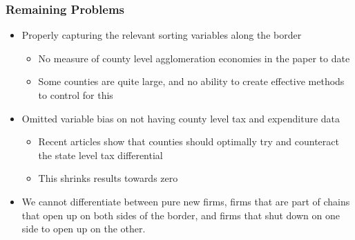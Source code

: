 \documentclass{beamer}
\begin{document}
\begin{frame}
\frametitle{Remaining Problems}
\begin{itemize}
\item Properly capturing the relevant sorting variables along the border
\begin{itemize}
\item No measure of county level agglomeration economies in the paper to date
\item Some counties are quite large, and no ability to create effective methods to control for this
\end{itemize}
\item Omitted variable bias on not having county level tax and expenditure data
\begin{itemize}
\item Recent articles show that counties should optimally try and counteract the state level tax differential
\item This shrinks results towards zero
\end{itemize}
\item We cannot differentiate between pure new firms, firms that are part of chains that open up on both sides of the border, and firms that shut down on one side to open up on the other.
\end{itemize}
\end{frame}
\end{document}
